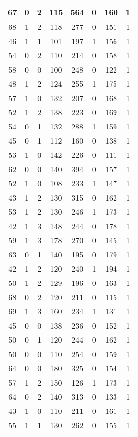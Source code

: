 \documentclass{article}
\begin{document}
\begin{longtable}{|c|c|c|c|c|c|c|c|}
67 & 0 & 2 & 115 & 564 & 0 & 160 & 1 \\ \hline
68 & 1 & 2 & 118 & 277 & 0 & 151 & 1 \\ \hline
46 & 1 & 1 & 101 & 197 & 1 & 156 & 1 \\ \hline
54 & 0 & 2 & 110 & 214 & 0 & 158 & 1 \\ \hline
58 & 0 & 0 & 100 & 248 & 0 & 122 & 1 \\ \hline
48 & 1 & 2 & 124 & 255 & 1 & 175 & 1 \\ \hline
57 & 1 & 0 & 132 & 207 & 0 & 168 & 1 \\ \hline
52 & 1 & 2 & 138 & 223 & 0 & 169 & 1 \\ \hline
54 & 0 & 1 & 132 & 288 & 1 & 159 & 1 \\ \hline
45 & 0 & 1 & 112 & 160 & 0 & 138 & 1 \\ \hline
53 & 1 & 0 & 142 & 226 & 0 & 111 & 1 \\ \hline
62 & 0 & 0 & 140 & 394 & 0 & 157 & 1 \\ \hline
52 & 1 & 0 & 108 & 233 & 1 & 147 & 1 \\ \hline
43 & 1 & 2 & 130 & 315 & 0 & 162 & 1 \\ \hline
53 & 1 & 2 & 130 & 246 & 1 & 173 & 1 \\ \hline
42 & 1 & 3 & 148 & 244 & 0 & 178 & 1 \\ \hline
59 & 1 & 3 & 178 & 270 & 0 & 145 & 1 \\ \hline
63 & 0 & 1 & 140 & 195 & 0 & 179 & 1 \\ \hline
42 & 1 & 2 & 120 & 240 & 1 & 194 & 1 \\ \hline
50 & 1 & 2 & 129 & 196 & 0 & 163 & 1 \\ \hline
68 & 0 & 2 & 120 & 211 & 0 & 115 & 1 \\ \hline
69 & 1 & 3 & 160 & 234 & 1 & 131 & 1 \\ \hline
45 & 0 & 0 & 138 & 236 & 0 & 152 & 1 \\ \hline
50 & 0 & 1 & 120 & 244 & 0 & 162 & 1 \\ \hline
50 & 0 & 0 & 110 & 254 & 0 & 159 & 1 \\ \hline
64 & 0 & 0 & 180 & 325 & 0 & 154 & 1 \\ \hline
57 & 1 & 2 & 150 & 126 & 1 & 173 & 1 \\ \hline
64 & 0 & 2 & 140 & 313 & 0 & 133 & 1 \\ \hline
43 & 1 & 0 & 110 & 211 & 0 & 161 & 1 \\ \hline
55 & 1 & 1 & 130 & 262 & 0 & 155 & 1 \\ \hline

\end{longtable}
\end{document}
